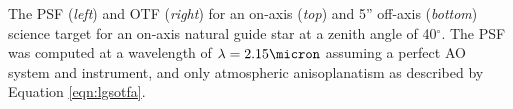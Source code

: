The PSF ({\em left}) and OTF ({\em right}) for an on-axis ({\em top}) and 5'' off-axis ({\em bottom}) science target for an on-axis natural guide star at a zenith angle of 40$^\circ$. 
The PSF was computed at a wavelength of $\lambda = 2.15 \micron$ assuming a perfect AO system and instrument, and only atmospheric anisoplanatism as described by Equation \ref{eqn:lgsotfa}.
\label{fig:ngs_perfect}
